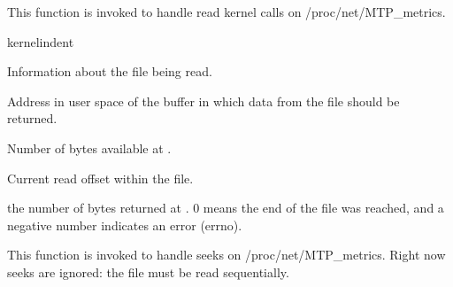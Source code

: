 \documentclass[letterpaper,10pt,english]{sphinxmanual}
\begin{document}
\begin{fulllineitems}

\pysigstartsignatures
{}
\pysigstopsignatures
\sphinxAtStartPar
This function is invoked to handle read kernel calls on /proc/net/MTP\_metrics.

\end{fulllineitems}


\begin{sphinxuseclass}{kernelindent}
\sphinxAtStartPar
{}
\begin{description}
\sphinxAtStartPar
Information about the file being read.

\sphinxAtStartPar
Address in user space of the buffer in which data from the file
should be returned.

\sphinxAtStartPar
Number of bytes available at .

\sphinxAtStartPar
Current read offset within the file.

\end{description}

\sphinxAtStartPar
{}

\sphinxAtStartPar
the number of bytes returned at . 0 means the end of the
file was reached, and a negative number indicates an error (\sphinxhyphen{}errno).

\end{sphinxuseclass}

\begin{fulllineitems}
\label{\detokenize{mtpimpl.c:c.MTP_metrics_lseek}}
\pysigstartsignatures
\pysigstartmultiline
{}
\pysigstopmultiline
\pysigstopsignatures
\sphinxAtStartPar
This function is invoked to handle seeks on /proc/net/MTP\_metrics. Right now seeks are ignored: the file must be read sequentially.

\end{fulllineitems}
\end{document}
